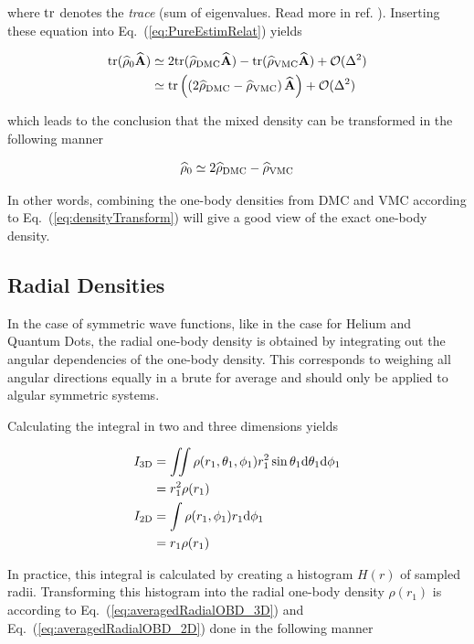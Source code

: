 where $\mathrm{tr}$ denotes the \textit{trace} (sum of eigenvalues. Read more in ref. \cite{leinaas}). Inserting these equation into Eq.~(\ref{eq:PureEstimRelat}) yields

\begin{align}
 \mathrm{tr}({\bf\widehat{\rho}}_0{\bf\widehat{A}}) &\simeq 2\mathrm{tr}({\bf\widehat{\rho}}_\mathrm{DMC}{\bf\widehat{A}}) -  \mathrm{tr}({\bf\widehat{\rho}}_\mathrm{VMC}{\bf\widehat{A}}) + \mathcal{O}(\Delta^2) \notag\\
  &\simeq \mathrm{tr}\left(\left(2{\bf\widehat{\rho}}_\mathrm{DMC} - {\bf\widehat{\rho}}_\mathrm{VMC}\right){\bf\widehat{A}}\right) + \mathcal{O}(\Delta^2)
\end{align}

which leads to the conclusion that the mixed density can be transformed in the following manner

\begin{equation}
 {\bf\widehat{\rho}}_0 \simeq 2{\bf\widehat{\rho}}_\mathrm{DMC} - {\bf\widehat{\rho}}_\mathrm{VMC} \label{eq:densityTransform}
\end{equation}

In other words, combining the one-body densities from DMC and VMC according to Eq.~(\ref{eq:densityTransform}) will give a good view of the exact one-body density.

\subsection{Radial Densities}

In the case of symmetric wave functions, like in the case for Helium and Quantum Dots, the radial one-body density is obtained by integrating out the angular dependencies of the one-body density. This corresponds to weighing all angular directions equally in a brute for average and should only be applied to algular symmetric systems.

Calculating the integral in two and three dimensions yields

\begin{align}
 I_\mathrm{3D} &= \iint \rho (r_1, \theta_1, \phi_1)r_1^2\sin\theta_1\mathrm{d}\theta_1\mathrm{d}\phi_1 \notag\\
   &= r_1^2\rho(r_1) \label{eq:averagedRadialOBD_3D} \\
 I_\mathrm{2D} &= \int \rho (r_1, \phi_1)r_1\mathrm{d}\phi_1 \notag\\
   &= r_1\rho(r_1) \label{eq:averagedRadialOBD_2D}
\end{align}

In practice, this integral is calculated by creating a histogram $H(r)$ of sampled radii. Transforming this histogram into the radial one-body density $\rho(r_1)$ is according to Eq.~(\ref{eq:averagedRadialOBD_3D}) and Eq.~(\ref{eq:averagedRadialOBD_2D}) done in the following manner

